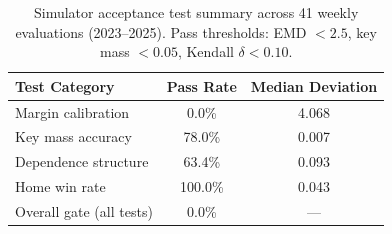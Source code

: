 \begin{table}[t]
    \centering
    \caption[Simulator acceptance summary]{Simulator acceptance test summary across 41 weekly evaluations (2023--2025). Pass thresholds: EMD $<2.5$, key mass $<0.05$, Kendall $\delta<0.10$.}
    \label{tab:sim-acceptance}
    \begin{tabular}{lcc}
      \toprule
      \textbf{Test Category} & \textbf{Pass Rate} & \textbf{Median Deviation} \\
      \midrule
      Margin calibration & 0.0\% & 4.068 \\
      Key mass accuracy & 78.0\% & 0.007 \\
      Dependence structure & 63.4\% & 0.093 \\
      Home win rate & 100.0\% & 0.043 \\
      \midrule
      Overall gate (all tests) & 0.0\% & --- \\
      \bottomrule
    \end{tabular}
  \end{table}
